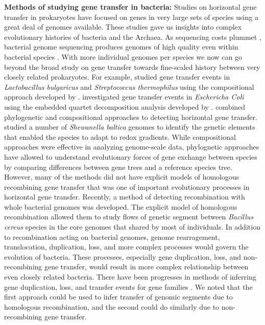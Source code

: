 \documentclass[english]{article}
\begin{document}
\textbf{Methods of studying gene transfer in bacteria:} 
Studies on horizontal gene transfer in prokaryotes have focused on genes in very
large sets of species \citep{Koonin2001} using a great deal of genomes
available.  These studies gave us insights into complex evolutionary histories
of bacteria and the Archaea.  As sequencing costs plummet \citep{Mardis2011},
bacterial genome sequencing produces genomes of high quality even within
bacterial species \citep{Tettelin2009a}.  With more individual genomes per
species we now can go beyond the broad study on gene transfer towards
fine-scaled history between very closely related prokaryotes.  For example,
\citet{Liu2009} studied gene transfer events in \emph{Lactobacillus bulgaricus}
and \emph{Streptococcus thermophilus} using the compositional approach developed
by \citet{Karlin2001}. \citet{Luo2011} investigated gene transfer events in
\emph{Eschericha Coli} using the embedded quartet decomposition analysis
developed by \citet{Zhaxybayeva2006}. \citet{Hamady2006} combined phylogenetic
and compositional approaches to detecting horizontal gene transfer.
\citet{Caro-Quintero2011} studied a number of \emph{Shewanella baltica} genomes
to identify the genetic elements that enabled the species to adapt to redox
gradients. While compositional approaches were effective in analyzing
genome-scale data, phylognetic approaches have allowed to understand
evolutionary forces of gene exchange between species
\citep[e.g.,][]{Bapteste2004,Simonson2005,Beiko2009} by comparing differences
between gene trees and a reference species tree.  However, many of the methods
did not have explicit models of homologous recombining gene transfer that was
one of important evolutionary processes in horizontal gene transfer.  
Recently, a method of detecting recombination 
with whole bacterial genomes \citep{Didelot2010} was developed. The explicit
model of homologous recombination allowed them to study 
flows of genetic segment between \emph{Bacillus cereus} species in the core
genomes that shared by most of individuals. 
In addition to recombination acting on bacterial genomes, genome rearragement,
translocation, duplication, loss, and more complex processes would govern the
evolution of bacteria. These processes, especially gene duplication, loss, and
non-recombining gene transfer, would result in more complex relationship between
even closely related bacteria. There have been progresses in 
methods of inferring gene duplication, loss, and transfer
events for gene families \citep{Doyon2011}. 
We noted that
the first approach could be used to infer transfer of genomic segments
due to homologous recombination, and the second could do similarly
due to non-recombining gene transfer. 
\end{document}
